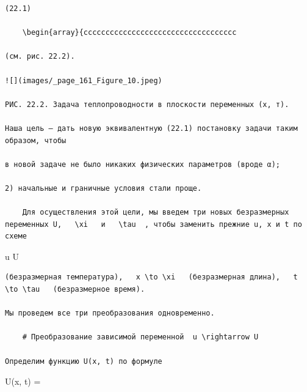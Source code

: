 \documentclass[
  ukrainian,
]{article}
\begin{document}
\begin{verbatim}
(22.1)

    \begin{array}{ccccccccccccccccccccccccccccccccccc

(см. рис. 22.2).

![](images/_page_161_Figure_10.jpeg)

РИС. 22.2. Задача теплопроводности в плоскости переменных (х, т).

Наша цель — дать новую эквивалентную (22.1) постановку задачи таким образом, чтобы

в новой задаче не было никаких физических параметров (вроде α);

2) начальные и граничные условия стали проще.

    Для осуществления этой цели, мы введем три новых безразмерных переменных U,   \xi   и   \tau  , чтобы заменить прежние u, x и t по схеме
\end{verbatim}

u \to U

\begin{verbatim}
(безразмерная температура),   x \to \xi   (безразмерная длина),   t \to \tau   (безразмерное время).

Мы проведем все три преобразования одновременно.

    # Преобразование зависимой переменной  u \rightarrow U

Определим функцию U(x, t) по формуле
\end{verbatim}

U(x, t) = 
\end{document}
